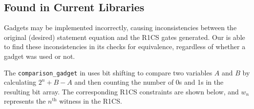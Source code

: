 \subsection{Found in Current Libraries}
Gadgets may be implemented incorrectly, causing inconsistencies between the original (desired) statement equation and the R1CS gates generated. Our \ConstraintChecker is able to find these inconsistencies in its checks for equivalence, regardless of whether a gadget was used or not. %

The \texttt{comparison\_gadget} in \libsnark uses bit shifting to compare two variables $A$ and $B$ by calculating $2^n + B - A$ and then counting the number of 0s and 1s in the resulting bit array. The corresponding R1CS constraints are shown below, and $w_n$ represents the $n^{\text{th}}$ witness in the R1CS.


